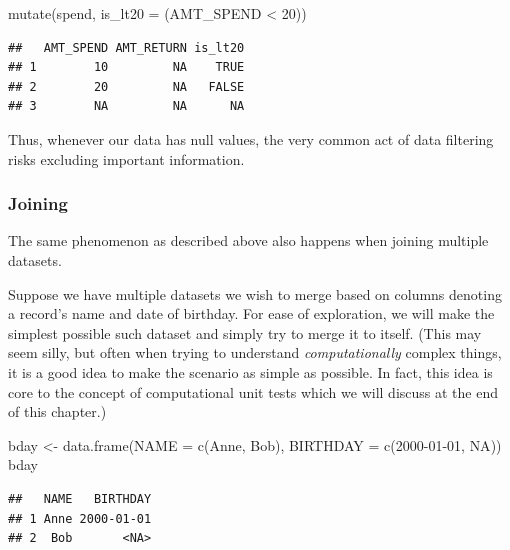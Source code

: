 \documentclass[
]{krantz}
\makeatletter
\newenvironment{Shaded}{\begin{snugshade}}{\end{snugshade}}
\newcommand{\AttributeTok}[1]{\textcolor[rgb]{0.61,0.61,0.61}{#1}}
\newcommand{\ConstantTok}[1]{\textcolor[rgb]{0,0,0}{#1}}
\newcommand{\DecValTok}[1]{\textcolor[rgb]{0.06,0.06,0.06}{#1}}
\newcommand{\FunctionTok}[1]{\textcolor[rgb]{0,0,0}{#1}}
\newcommand{\NormalTok}[1]{#1}
\newcommand{\OtherTok}[1]{\textcolor[rgb]{0.37,0.37,0.37}{#1}}
\newcommand{\SpecialCharTok}[1]{\textcolor[rgb]{0,0,0}{#1}}
\newcommand{\StringTok}[1]{\textcolor[rgb]{0.5,0.5,0.5}{#1}}
\newenvironment{kframe}{%
\medskip{}
\setlength{\fboxsep}{.8em}
 \def\at@end@of@kframe{}%
 \ifinner\ifhmode%
  \def\at@end@of@kframe{\end{minipage}}%
  \begin{minipage}{\columnwidth}%
 \fi\fi%
 \def\FrameCommand##1{\hskip\@totalleftmargin \hskip-\fboxsep
 \colorbox{shadecolor}{##1}\hskip-\fboxsep
     \hskip-\linewidth \hskip-\@totalleftmargin \hskip\columnwidth}%
 \MakeFramed {\advance\hsize-\width
   \@totalleftmargin\z@ \linewidth\hsize
   \@setminipage}}%
 {\par\unskip\endMakeFramed%
 \at@end@of@kframe}
\renewenvironment{Shaded}{\begin{kframe}}{\end{kframe}}
\makeatother
\begin{document}
\begin{Shaded}
\begin{Highlighting}[]
\FunctionTok{mutate}\NormalTok{(spend, }\AttributeTok{is\_lt20 =}\NormalTok{ (AMT\_SPEND }\SpecialCharTok{\textless{}} \DecValTok{20}\NormalTok{))}
\end{Highlighting}
\end{Shaded}

\begin{verbatim}
##   AMT_SPEND AMT_RETURN is_lt20
## 1        10         NA    TRUE
## 2        20         NA   FALSE
## 3        NA         NA      NA
\end{verbatim}

Thus, whenever our data has null values, the very common act of data filtering risks excluding important information.

\hypertarget{joining}{%
\subsubsection{Joining}\label{joining}}

The same phenomenon as described above also happens when joining multiple datasets.

Suppose we have multiple datasets we wish to merge based on columns denoting a record's name and date of birthday.
For ease of exploration, we will make the simplest possible such dataset and simply try to merge it to itself.
(This may seem silly, but often when trying to understand \emph{computationally} complex things, it is a good idea to make the scenario as simple as possible.
In fact, this idea is core to the concept of computational unit tests which we will discuss at the end of this chapter.)

\begin{Shaded}
\begin{Highlighting}[]
\NormalTok{bday }\OtherTok{\textless{}{-}} \FunctionTok{data.frame}\NormalTok{(}\AttributeTok{NAME =} \FunctionTok{c}\NormalTok{(}\StringTok{\textquotesingle{}Anne\textquotesingle{}}\NormalTok{, }\StringTok{\textquotesingle{}Bob\textquotesingle{}}\NormalTok{), }\AttributeTok{BIRTHDAY =} \FunctionTok{c}\NormalTok{(}\StringTok{\textquotesingle{}2000{-}01{-}01\textquotesingle{}}\NormalTok{, }\ConstantTok{NA}\NormalTok{))}
\NormalTok{bday}
\end{Highlighting}
\end{Shaded}

\begin{verbatim}
##   NAME   BIRTHDAY
## 1 Anne 2000-01-01
## 2  Bob       <NA>
\end{verbatim}
\end{document}
